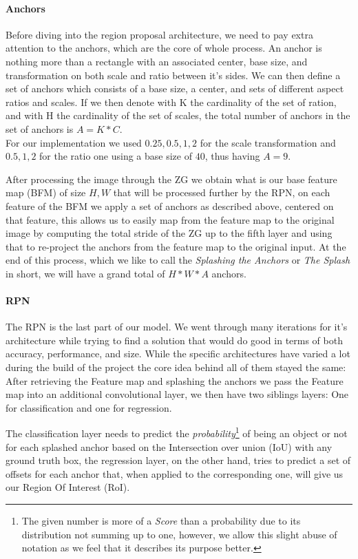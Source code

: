 \documentclass[10pt,journal,cspaper,compsoc]{IEEEtran}
\begin{document}
   \paragraph*{Anchors}
    Before diving into the region proposal architecture, we need to pay extra attention to the anchors, which are the core of whole process. An anchor is nothing more than a rectangle with an associated center, base size, and transformation on both scale and ratio between it's sides. We can then define a set of anchors which consists of a base size, a center, and sets of different 
   aspect ratios and scales. If we then denote with K the cardinality of the set of ration, and with H the cardinality of the set of scales, the total number of anchors in the set of anchors is $A = K * C$. \\
   For our implementation we used ${0.25, 0.5, 1, 2}$ for the scale transformation and ${0.5, 1, 2}$ for the ratio one using a base size of $40$, thus having $A = 9$.

   After processing the image through the ZG we obtain what is our base feature map (BFM) of size $H, W$ that will be processed further by the RPN, on each feature of the BFM we apply a set of anchors as described above, centered on that feature, this allows us to easily map from the feature map to the original image by computing the total stride of the ZG up to the fifth layer and using that to re-project the anchors from the feature map to the original input.
   At the end of this process, which we like to call the \emph{Splashing the Anchors} or \emph{The Splash} in short, we will have a grand total of $H*W*A$ anchors.
  \paragraph*{RPN}
    The RPN is the last part of our model. We went through many iterations for it's architecture while trying to find a solution that would do good in terms of both accuracy, performance, and size. While the specific architectures have varied a lot during the build of the project the core idea behind all of them stayed the same: After retrieving the Feature map and splashing the anchors we pass the Feature map into an additional convolutional layer,
    we then have two siblings layers: One for classification and one for regression. 
    
    The classification layer needs to predict the \emph{probability}\footnote{The given number is more of a \emph{Score} than a probability due to its distribution not summing up to one, however, we allow this slight abuse of notation as we feel that it describes its purpose better.} of being an object or not for each splashed anchor based on the Intersection over union (IoU) with any ground truth box, the regression layer, on the other hand, tries to predict a set of offsets for each anchor that, when applied to the corresponding one, will give us our Region Of Interest (RoI).
\end{document}
